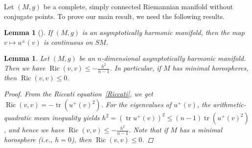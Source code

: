 \documentclass[12pt,a4paper]{amsart}
\newtheorem{Lem}[Thm]{Lemma}
\theoremstyle{definition}
\theoremstyle{remark}
\renewcommand{\phi}{\varphi}
\newcommand{\Ric}{\operatorname{Ric}}
\newcommand{\tr}{\operatorname{tr}}
\newcommand \<{\langle}
\renewcommand \>{\rangle}
\begin{document}

Let $(M,g)$ be a complete, simply connected Riemannian
manifold without conjugate points.
To prove our main result, we need the following {results}.

\begin{Lem}[\cite{Z}]\label{cont}
If $(M, g)$ is an asymptotically harmonic
manifold, then the map $v \mapsto u^{\pm}(v)$ is continuous on $SM$.
\end{Lem}

\begin{Lem}\label{vec}
    Let $(M,g)$ be an $n$-dimensional asymptotically harmonic manifold. Then we have $\Ric(v,v)\le -\frac{h^2}{n-1}$. In particular, if $M$ has minimal horospheres, then $\Ric(v,v)\le 0$.
\begin{proof}
    From the Riccati equation~\eqref{Riccati}, we get $\Ric(v,v)=-\tr(u^{+}(v)^2)$. For the eigenvalues of $u^{+}(v)$, the arithmetic-quadratic mean inequality yields $h^2 = (\tr u^{+}(v))^2\le (n-1)\tr(u^{+}(v)^2)$, and hence we have $\Ric(v,v)\le -\frac{h^2}{n-1}$. Note that if $M$ has a minimal horosphere (i.e., $h=0$), then $\Ric(v,v)\le 0$.
\end{proof}
\end{Lem}
\end{document}
